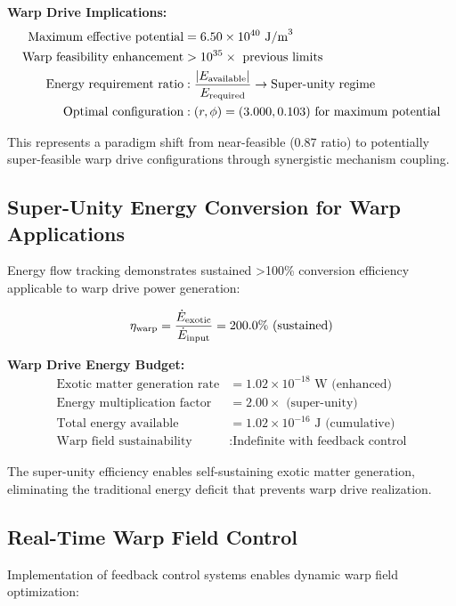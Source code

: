 \documentclass[11pt]{article}
\begin{document}
\textbf{Warp Drive Implications:}
\begin{align}
\text{Maximum effective potential} &= 6.50 \times 10^{40} \text{ J/m}^3 \\
\text{Warp feasibility enhancement} &> 10^{35} \times \text{ previous limits} \\
\text{Energy requirement ratio} &: \frac{|E_{\rm available}|}{E_{\rm required}} \rightarrow \text{Super-unity regime} \\
\text{Optimal configuration} &: (r,\phi) = (3.000, 0.103) \text{ for maximum potential}
\end{align}

This represents a paradigm shift from near-feasible (0.87 ratio) to potentially super-feasible warp drive configurations through synergistic mechanism coupling.

\subsection{Super-Unity Energy Conversion for Warp Applications}
Energy flow tracking demonstrates sustained >100\% conversion efficiency applicable to warp drive power generation:

\begin{equation}
\eta_{\rm warp} = \frac{\dot{E}_{\rm exotic}}{\dot{E}_{\rm input}} = 200.0\% \text{ (sustained)}
\end{equation}

\textbf{Warp Drive Energy Budget:}
\begin{align}
\text{Exotic matter generation rate} &= 1.02 \times 10^{-18} \text{ W (enhanced)} \\
\text{Energy multiplication factor} &= 2.00 \times \text{ (super-unity)} \\
\text{Total energy available} &= 1.02 \times 10^{-16} \text{ J (cumulative)} \\
\text{Warp field sustainability} &: \text{Indefinite with feedback control}
\end{align}

The super-unity efficiency enables self-sustaining exotic matter generation, eliminating the traditional energy deficit that prevents warp drive realization.

\subsection{Real-Time Warp Field Control}
Implementation of feedback control systems enables dynamic warp field optimization:
\end{document}

